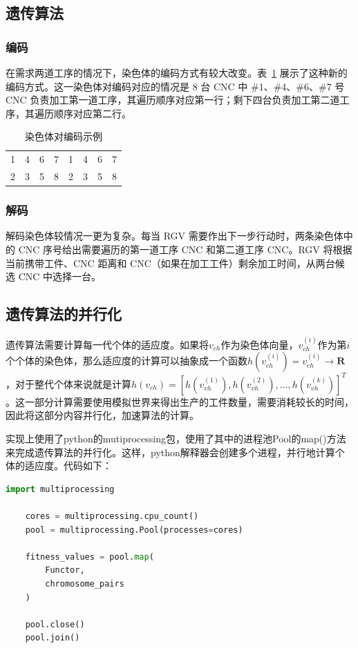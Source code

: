 \documentclass{cumcmthesis}
\begin{document}
	\subsection{遗传算法}

	\subsubsection{编码}

	在需求两道工序的情况下，染色体的编码方式有较大改变。表~\ref{table:chromosome_2} 展示了这种新的编码方式。这一染色体对编码对应的情况是 8 台 CNC 中 \#1、\#4、\#6、\#7 号 CNC 负责加工第一道工序，其遍历顺序对应第一行；剩下四台负责加工第二道工序，其遍历顺序对应第二行。
	
	\begin{table}[!htbp]
		\centering
		\caption{染色体对编码示例}
		\label{table:chromosome_2}
		\begin{tabular}{cccccccc}
			\toprule[1.5pt]
			1 & 4 & 6 & 7 & 1 & 4 & 6 & 7 \\
			2 & 3 & 5 & 8 & 2 & 3 & 5 & 8 \\
			\bottomrule[1.5pt]
		\end{tabular}
	\end{table}

	\subsubsection{解码}
	
	解码染色体较情况一更为复杂。每当 RGV 需要作出下一步行动时，两条染色体中的 CNC 序号给出需要遍历的第一道工序 CNC 和第二道工序 CNC。RGV 将根据当前携带工件、CNC 距离和 CNC（如果在加工工件）剩余加工时间，从两台候选 CNC 中选择一台。

	\subsection{遗传算法的并行化}
	遗传算法需要计算每一代个体的适应度。如果将$v_{ch}$作为染色体向量，$v_{ch}^{(i)}$作为第$i$个个体的染色体，那么适应度的计算可以抽象成一个函数$h(v_{ch}^{(i)})=v_{ch}^{(i)}\rightarrow\mathbf{R}$，对于整代个体来说就是计算$h(v_{ch})=[h(v_{vh}^{(1)}),h(v_{vh}^{(2)}),...,h(v_{vh}^{(k)})]^T$。这一部分计算需要使用模拟世界来得出生产的工件数量，需要消耗较长的时间，因此将这部分内容并行化，加速算法的计算。
	
	实现上使用了python的mutiprocessing包，使用了其中的进程池Pool的map()方法来完成遗传算法的并行化。这样，python解释器会创建多个进程，并行地计算个体的适应度。代码如下：
	\begin{lstlisting}[language=python]
	import multiprocessing
	
	cores = multiprocessing.cpu_count()
	pool = multiprocessing.Pool(processes=cores)
	
	fitness_values = pool.map(
		Functor,
		chromosome_pairs
	)
	
	pool.close()
	pool.join()
	\end{lstlisting}
	
\end{document}
